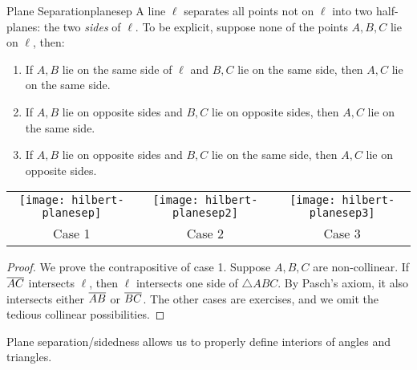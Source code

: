 \begin{thm}{Plane Separation}{planesep}
	A line $\ell$ separates all points not on $\ell$ into two half-planes: the two \emph{sides} of $\ell$. To be explicit, suppose none of the points $A,B,C$ lie on $\ell$, then:
	\begin{enumerate}\itemsep0pt
	  \item If $A,B$ lie on the same side of $\ell$ and $B,C$ lie on the same side, then $A,C$ lie on the same side.
	  \item If $A,B$ lie on opposite sides and $B,C$ lie on opposite sides, then $A,C$ lie on the same side.
	  \item If $A,B$ lie on opposite sides and $B,C$ lie on the same side, then $A,C$ lie on opposite sides.
	\end{enumerate}\vspace{-10pt}
	\begin{center}
		\begin{tabular}{c@{\qquad}c@{\qquad}c}
			\texttt{[image: hilbert-planesep]}
			&
			\texttt{[image: hilbert-planesep2]}
			&
			\texttt{[image: hilbert-planesep3]}
			\\
			Case 1
			&
			Case 2
			&
			Case 3
		\end{tabular}
	\end{center}
\end{thm}

\begin{proof}
	We prove the contrapositive of case 1. Suppose $A,B,C$ are non-collinear. If $\overline{AC}$ intersects $\ell$, then $\ell$ intersects one side of $\triangle ABC$. By Pasch's axiom, it also intersects either $\overline{AB}$ or $\overline{BC}$.\smallbreak
	The other cases are exercises, and we omit the tedious collinear possibilities.
\end{proof}

Plane separation/sidedness allows us to properly define interiors of angles and triangles. 

